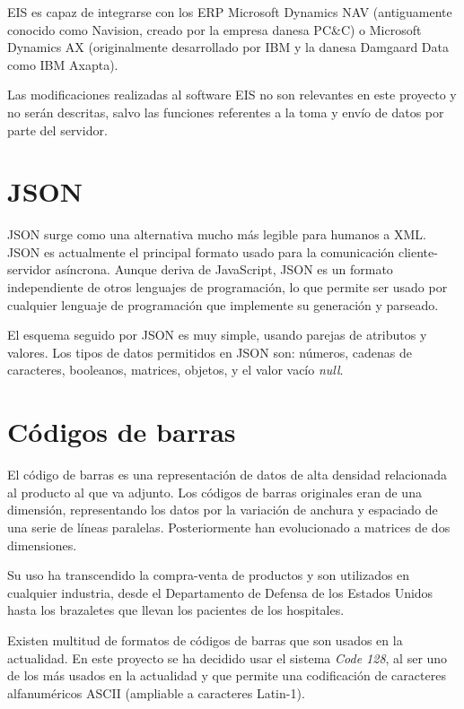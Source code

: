 EIS es capaz de integrarse con los ERP Microsoft Dynamics NAV (antiguamente conocido como Navision, creado por la empresa danesa PC\&C) o Microsoft Dynamics AX (originalmente desarrollado por IBM y la danesa Damgaard Data como IBM Axapta).

Las modificaciones realizadas al software EIS no son relevantes en este proyecto y no serán descritas, salvo las funciones referentes a la toma y envío de datos por parte del servidor.

\section{JSON}
JSON \cite{JSON} surge como una alternativa mucho más legible para humanos a XML. JSON es actualmente el principal formato usado para la comunicación cliente-servidor asíncrona. Aunque deriva de JavaScript, JSON es un formato independiente de otros lenguajes de programación, lo que permite ser usado por cualquier lenguaje de programación que implemente su generación y parseado.

El esquema seguido por JSON es muy simple, usando parejas de atributos y valores. Los tipos de datos permitidos en JSON son: números, cadenas de caracteres, booleanos, matrices, objetos, y el valor vacío \textit{null}.

\section{Códigos de barras}
El código de barras es una representación de datos de alta densidad relacionada al producto al que va adjunto. Los códigos de barras originales eran de una dimensión, representando los datos por la variación de anchura y espaciado de una serie de líneas paralelas. Posteriormente han evolucionado a matrices de dos dimensiones.

Su uso ha transcendido la compra-venta de productos y son utilizados en cualquier industria, desde el Departamento de Defensa de los Estados Unidos hasta los brazaletes que llevan los pacientes de los hospitales.

Existen multitud de formatos de códigos de barras que son usados en la actualidad. En este proyecto se ha decidido usar el sistema \textit{Code 128}, al ser uno de los más usados en la actualidad y que permite una codificación de caracteres alfanuméricos ASCII (ampliable a caracteres Latin-1).

\chapterend
